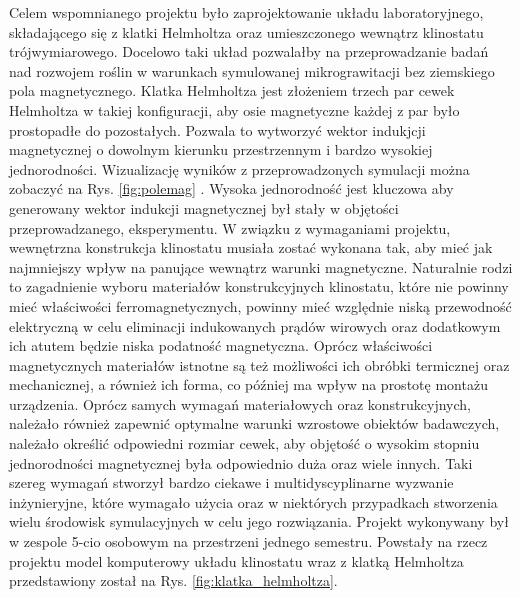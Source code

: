 Celem wspomnianego projektu było zaprojektowanie układu laboratoryjnego, składającego się z
 klatki Helmholtza oraz umieszczonego wewnątrz klinostatu trójwymiarowego. Docelowo taki układ
  pozwalałby na przeprowadzanie badań nad rozwojem roślin w warunkach symulowanej
   mikrograwitacji bez ziemskiego pola magnetycznego. Klatka Helmholtza jest złożeniem trzech
    par cewek Helmholtza \linebreak w takiej konfiguracji, aby osie magnetyczne każdej z par było
     prostopadłe do pozostałych. Pozwala to wytworzyć wektor indukjcji magnetycznej o dowolnym
      kierunku przestrzennym i bardzo wysokiej jednorodności. Wizualizację wyników \linebreak z przeprowadzonych symulacji można zobaczyć na Rys. \ref{fig:polemag} . Wysoka jednorodność jest kluczowa
       aby generowany wektor indukcji magnetycznej był stały \linebreak w objętości przeprowadzanego,
        eksperymentu. W związku z wymaganiami projektu, wewnętrzna konstrukcja klinostatu
         musiała zostać wykonana tak, aby mieć jak najmniejszy wpływ na panujące wewnątrz
          warunki magnetyczne. Naturalnie rodzi to zagadnienie wyboru materiałów konstrukcyjnych
           klinostatu, które nie powinny mieć właściwości ferromagnetycznych, powinny mieć
            względnie niską przewodność elektryczną w celu eliminacji indukowanych prądów
             wirowych oraz dodatkowym ich atutem będzie niska podatność magnetyczna. Oprócz
              właściwości magnetycznych materiałów istnotne są też możliwości ich obróbki
               termicznej oraz mechanicznej, a również ich forma, co później ma wpływ na
                prostotę montażu urządzenia. Oprócz samych wymagań materiałowych oraz
                 konstrukcyjnych, należało również zapewnić optymalne warunki wzrostowe obiektów
                  badawczych, należało określić odpowiedni rozmiar cewek, aby objętość o wysokim
                   stopniu jednorodności magnetycznej była odpowiednio duża oraz wiele innych.
                    Taki szereg wymagań stworzył bardzo ciekawe i multidyscyplinarne wyzwanie
                     inżynieryjne, które wymagało użycia oraz w niektórych przypadkach
                      stworzenia wielu środowisk symulacyjnych \linebreak w celu jego rozwiązania. Projekt
                       wykonywany był w zespole 5-cio osobowym \linebreak na przestrzeni jednego semestru.
                        Powstały na rzecz projektu model komputerowy układu klinostatu wraz z
                         klatką Helmholtza przedstawiony został na Rys.
                          \ref{fig:klatka_helmholtza}.
                          
